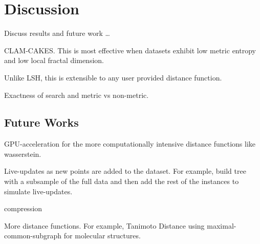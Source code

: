 \section{Discussion}
\label{sec:discussion}

Discuss results and future work \dots

CLAM-CAKES.
This is most effective when datasets exhibit low metric entropy and low local fractal dimension.

Unlike LSH, this is extensible to any user provided distance function.

Exactness of search and metric vs non-metric.


\subsection{Future Works}
\label{subsec:results:future-works}

GPU-acceleration for the more computationally intensive distance functions like wasserstein.

Live-updates as new points are added to the dataset.
For example, build tree with a subsample of the full data and then add the rest of the instances to simulate live-updates.

compression

More distance functions. For example, Tanimoto Distance using maximal-common-subgraph for molecular structures.

